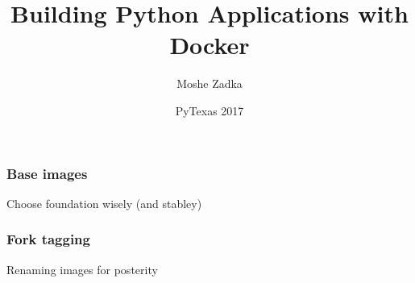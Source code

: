 \documentclass{beamer}
\title{Building Python Applications with Docker}
\author{Moshe Zadka}
\date{PyTexas 2017}
\begin{document}
 
\frame{\titlepage}
 
\begin{frame}
\frametitle{Base images}
Choose foundation wisely (and stabley)
\end{frame}

\begin{frame}
\frametitle{Fork tagging}
Renaming images for posterity
\end{frame}
\end{document}
